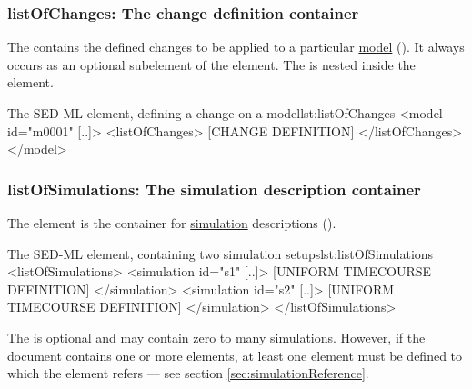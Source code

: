 \subsubsection{listOfChanges: The change definition container}
\label{sec:listOfChanges}
The  contains the defined changes to be applied to a particular \hyperref[class:model]{model} (). It always occurs as an optional subelement of the  element. The  is nested inside the  element.



\begin{myXmlLst}{The SED-ML  element, defining a change on a model}{lst:listOfChanges}
<model id="m0001" [..]>
	<listOfChanges>
		[CHANGE DEFINITION]
	</listOfChanges>
</model>
\end{myXmlLst}


\subsubsection{listOfSimulations: The simulation description container}
\label{sec:listOfSimulations}
The  element is the container for \hyperref[class:simulation]{simulation} descriptions ().



\begin{myXmlLst}{The SED-ML  element, containing two simulation setups}{lst:listOfSimulations}
<listOfSimulations>
	<simulation id="s1" [..]>
		[UNIFORM TIMECOURSE DEFINITION]
	</simulation>
	<simulation id="s2" [..]>
   		[UNIFORM TIMECOURSE DEFINITION]
	</simulation>
</listOfSimulations>
\end{myXmlLst}

The  is optional and may contain zero to many simulations. However, if the \currentLV document contains one or more  elements, at least one  element must be defined to which  the  element refers --- see section \ref{sec:simulationReference}.



